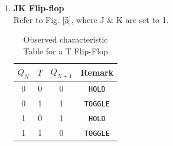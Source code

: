 \begin{enumerate}
    \item \textbf{JK Flip-flop}\\
    Refer to Fig. \ref{5}, where J \& K are set to 1.
    \begin{table}[H]
        \centering
        \begin{tabular}{|c|c|c|c|}\hline
            $Q_N$ & $T$ & $Q_{N+1}$ & Remark\\ \hline
            0 & 0 & 0 & \verb|HOLD| \\ 
            0 & 1 & 1 & \verb|TOGGLE| \\ 
            1 & 0 & 1 & \verb|HOLD| \\ 
            1 & 1 & 0 & \verb|TOGGLE|\\ \hline
        \end{tabular}
        \caption{Observed characteristic Table for a T Flip-Flop}
    \end{table}

\end{enumerate}